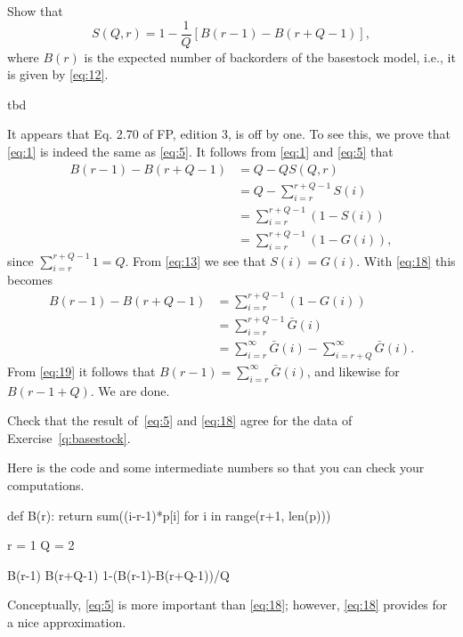 \begin{exercise}[\faRocket]
Show that 
\begin{equation}\label{eq:18}
   S(Q,r) = 1- \frac1Q [B(r-1) - B(r+Q-1)],
\end{equation}
where $B(r)$ is the expected number of backorders of the basestock model, i.e., it is given by \eqref{eq:12}. 
\begin{solution}
tbd
  
It appears that Eq. 2.70 of FP, edition 3, is off by one. To see
this, we prove that \eqref{eq:1} is indeed the same as \eqref{eq:5}. It
follows from \eqref{eq:1} and \eqref{eq:5} that
\begin{align*}
   B(r-1) - B(r+Q-1) 
   &= Q - Q S(Q,r) \\
   &= Q - \sum_{i=r}^{r+Q-1} S(i) \\
   &= \sum_{i=r}^{r+Q-1}(1- S(i)) \\
   &= \sum_{i=r}^{r+Q-1}(1- G(i)),
\end{align*}
since $\sum_{i=r}^{r+Q-1} 1 = Q$. From \eqref{eq:13} we see that $S(i)
= G(i)$. With \eqref{eq:18} this becomes
\begin{align*}
    B(r-1) - B(r+Q-1)
    &= \sum_{i=r}^{r+Q-1}(1- G(i))\\
    &= \sum_{i=r}^{r+Q-1} \bar G(i)\\
    &= \sum_{i=r}^{\infty} \bar G(i) -\sum_{i=r+Q}^\infty \bar G(i).
\end{align*}
From \eqref{eq:19} it follows that $B(r-1)=\sum_{i=r}^{\infty} \bar
G(i)$, and likewise for $B(r-1+Q)$. We are done.
\end{solution}
\end{exercise}

\begin{exercise}
  Check that the result of~\eqref{eq:5} and \eqref{eq:18} agree for the data of Exercise~\ref{q:basestock}. 
  \begin{solution}
Here is the code and some intermediate numbers so that you can check your computations.

    \begin{pyconsole}
def B(r):
    return sum((i-r-1)*p[i] for i in range(r+1, len(p)))
   
r = 1
Q = 2
   
B(r-1)
B(r+Q-1)
1-(B(r-1)-B(r+Q-1))/Q
    \end{pyconsole}
  \end{solution}
\end{exercise}

Conceptually, \eqref{eq:5} is more important than \eqref{eq:18}; however, \eqref{eq:18}  provides for a nice approximation.

